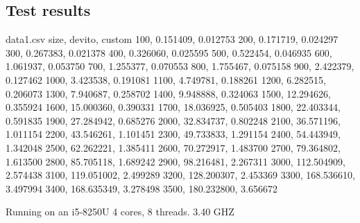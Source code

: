 \documentclass{article}
\begin{document}
\subsection*{Test results}

\begin{filecontents*}{data1.csv}
	size, devito, custom
	100, 0.151409, 0.012753
	200, 0.171719, 0.024297
	300, 0.267383, 0.021378
	400, 0.326060, 0.025595
	500, 0.522454, 0.046935
	600, 1.061937, 0.053750
	700, 1.255377, 0.070553
	800, 1.755467, 0.075158
	900, 2.422379, 0.127462
	1000, 3.423538, 0.191081
	1100, 4.749781, 0.188261
	1200, 6.282515, 0.206073
	1300, 7.940687, 0.258702
	1400, 9.948888, 0.324063
	1500, 12.294626, 0.355924
	1600, 15.000360, 0.390331
	1700, 18.036925, 0.505403
	1800, 22.403344, 0.591835
	1900, 27.284942, 0.685276
	2000, 32.834737, 0.802248
	2100, 36.571196, 1.011154
	2200, 43.546261, 1.101451
	2300, 49.733833, 1.291154
	2400, 54.443949, 1.342048
	2500, 62.262221, 1.385411
	2600, 70.272917, 1.483700
	2700, 79.364802, 1.613500
	2800, 85.705118, 1.689242
	2900, 98.216481, 2.267311
	3000, 112.504909, 2.574438
	3100, 119.051002, 2.499289
	3200, 128.200307, 2.453369
	3300, 168.536610, 3.497994
	3400, 168.635349, 3.278498
	3500, 180.232800, 3.656672
\end{filecontents*}
Running on an i5-8250U 4 cores, 8 threads. 3.40 GHZ \\ \\
\end{document}

